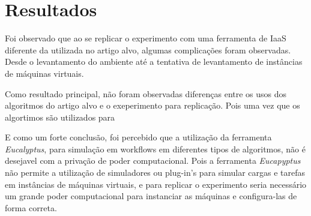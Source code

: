 \section{Resultados}

Foi observado que ao se replicar o experimento com uma ferramenta de IaaS diferente da utilizada no artigo alvo, algumas complicações foram observadas. Desde o levantamento do ambiente até a tentativa de levantamento de instâncias de máquinas virtuais.

Como resultado principal, não foram observadas diferenças entre os usos dos algoritmos do artigo alvo e o exeperimento para replicação. Pois uma vez que os algortimos são utilizados para

E como um forte conclusão, foi percebido que a utilização da ferramenta \textit{Eucalyptus}, para simulação em workflows em diferentes tipos de algoritmos, não é desejavel com a privação de poder computacional. Pois a ferramenta \textit{Eucapyptus} não permite a utilização de simuladores ou plug-in's para simular cargas e tarefas em instâncias de máquinas virtuais, e para replicar o experimento seria necessário um grande poder computacional para instanciar as máquinas e configura-las de forma correta.
